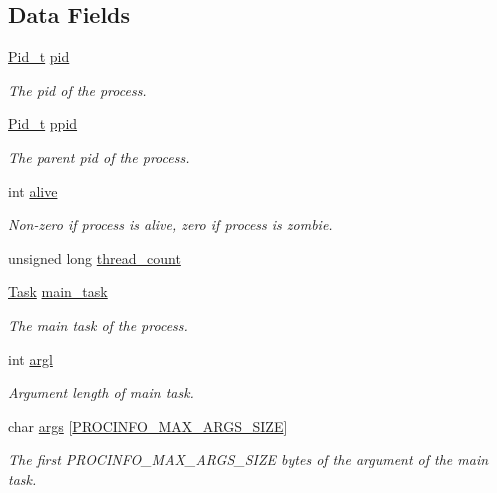 \subsection*{Data Fields}
\begin{DoxyCompactItemize}
\item 
\mbox{\label{structprocinfo_a2e87cd5f0bdfe214832ec20f53deeb50}} 
\hyperlink{group__syscalls_gafac07f3170763932fac97b6eab2c3984}{Pid\+\_\+t} \hyperlink{structprocinfo_a2e87cd5f0bdfe214832ec20f53deeb50}{pid}
\begin{DoxyCompactList}\small\item\em The pid of the process. \end{DoxyCompactList}\item 
\hyperlink{group__syscalls_gafac07f3170763932fac97b6eab2c3984}{Pid\+\_\+t} \hyperlink{structprocinfo_a790970c70987013b2712b7dd6d2b75b9}{ppid}
\begin{DoxyCompactList}\small\item\em The parent pid of the process. \end{DoxyCompactList}\item 
\mbox{\label{structprocinfo_a999dc5dbfee9902a9ea458944499efd3}} 
int \hyperlink{structprocinfo_a999dc5dbfee9902a9ea458944499efd3}{alive}
\begin{DoxyCompactList}\small\item\em Non-\/zero if process is alive, zero if process is zombie. \end{DoxyCompactList}\item 
unsigned long \hyperlink{structprocinfo_ae1ed3afa8904729a1daf1b51780cf2cf}{thread\+\_\+count}
\item 
\mbox{\label{structprocinfo_a4da339065f8780b37ab788f18ef9ed20}} 
\hyperlink{group__syscalls_gaec3f2f835e105271fbbc00272c0ba984}{Task} \hyperlink{structprocinfo_a4da339065f8780b37ab788f18ef9ed20}{main\+\_\+task}
\begin{DoxyCompactList}\small\item\em The main task of the process. \end{DoxyCompactList}\item 
int \hyperlink{structprocinfo_ac63081c5a10bc230c115eea36c5f22fd}{argl}
\begin{DoxyCompactList}\small\item\em Argument length of main task. \end{DoxyCompactList}\item 
char \hyperlink{structprocinfo_ac812ea3215fafc8ced9f91320b2d3959}{args} \mbox{[}\hyperlink{group__syscalls_ga657ad9e9d81dcca25fb225cf99051e0d}{P\+R\+O\+C\+I\+N\+F\+O\+\_\+\+M\+A\+X\+\_\+\+A\+R\+G\+S\+\_\+\+S\+I\+ZE}\mbox{]}
\begin{DoxyCompactList}\small\item\em The first {\ttfamily P\+R\+O\+C\+I\+N\+F\+O\+\_\+\+M\+A\+X\+\_\+\+A\+R\+G\+S\+\_\+\+S\+I\+ZE} bytes of the argument of the main task. \end{DoxyCompactList}\end{DoxyCompactItemize}


